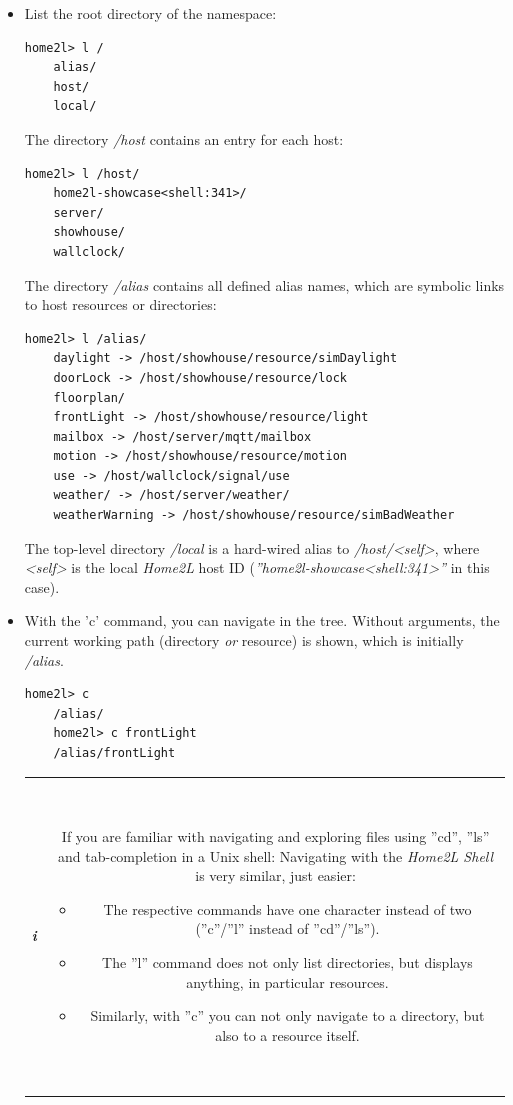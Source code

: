 \documentclass[12pt,english,parskip=half,headheight=19pt]{scrreprt}
\newcommand{\infobox}[1]{
  \par
  \medskip
  \hfill
  \setlength\arrayrulewidth{1pt}
  \begin{tabular}[t]{c|c|}
    \parbox{1.8em}{\hfill\textit{\Huge\textbf{i}\,}}
    &
    \,\parbox{0.89\linewidth}{\setlength{\parskip}{0.5em} \small #1}\,
  \end{tabular}
  \medskip
  \par
}
\begin{document}
\begin{itemize}[$\blacktriangleright$]

\item
  List the root directory of the namespace:
  \begin{lstlisting}[language=home2l]
    home2l> l /
    alias/
    host/
    local/
  \end{lstlisting}

  The directory \textit{/host} contains an entry for each host:
  \begin{lstlisting}[language=home2l]
    home2l> l /host/
    home2l-showcase<shell:341>/
    server/
    showhouse/
    wallclock/
  \end{lstlisting}

  The directory \textit{/alias} contains all defined alias names, which are symbolic
  links to host resources or directories:
  \begin{lstlisting}[language=home2l]
    home2l> l /alias/
    daylight -> /host/showhouse/resource/simDaylight
    doorLock -> /host/showhouse/resource/lock
    floorplan/
    frontLight -> /host/showhouse/resource/light
    mailbox -> /host/server/mqtt/mailbox
    motion -> /host/showhouse/resource/motion
    use -> /host/wallclock/signal/use
    weather/ -> /host/server/weather/
    weatherWarning -> /host/showhouse/resource/simBadWeather
  \end{lstlisting}

  The top-level directory \textit{/local} is a hard-wired alias to
  \textit{/host/<self>}, where \textit{<self>} is the local
  \textit{Home2L} host ID (\textit{''home2l-showcase<shell:341>''} in this case).

\item
  With the 'c' command, you can navigate in the tree. Without arguments, the current working path
  (directory \textit{or} resource) is shown, which is initially \textit{/alias}.
  \begin{lstlisting}[language=home2l]
    home2l> c
    /alias/
    home2l> c frontLight
    /alias/frontLight
  \end{lstlisting}

  \infobox{
    If you are familiar with navigating and exploring files using ''cd'', ''ls'' and
    tab-completion in a Unix shell: Navigating with the \textit{Home2L Shell} is very
    similar, just easier:
    \begin{itemize}
      \item The respective commands have one character instead of two (''c''/''l'' instead of ''cd''/''ls'').
      \item The ''l'' command does not only list directories, but displays anything, in particular resources.
      \item Similarly, with ''c'' you can not only navigate to a directory, but also to a resource itself.
    \end{itemize}
  }


\end{itemize}
\end{document}
